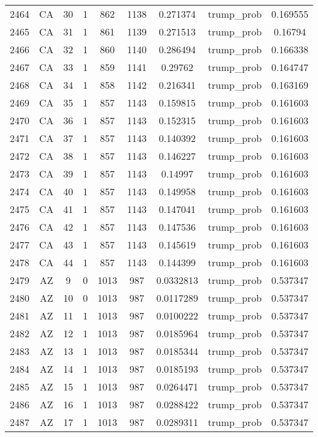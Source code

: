 \documentclass[12pt,a4paper]{article}
\begin{document}
\begin{tabular}{r|cccccccc}
	2464 & CA & 30 & 1 & 862 & 1138 & 0.271374 & trump\_prob & 0.169555 \\
	2465 & CA & 31 & 1 & 861 & 1139 & 0.271513 & trump\_prob & 0.16794 \\
	2466 & CA & 32 & 1 & 860 & 1140 & 0.286494 & trump\_prob & 0.166338 \\
	2467 & CA & 33 & 1 & 859 & 1141 & 0.29762 & trump\_prob & 0.164747 \\
	2468 & CA & 34 & 1 & 858 & 1142 & 0.216341 & trump\_prob & 0.163169 \\
	2469 & CA & 35 & 1 & 857 & 1143 & 0.159815 & trump\_prob & 0.161603 \\
	2470 & CA & 36 & 1 & 857 & 1143 & 0.152315 & trump\_prob & 0.161603 \\
	2471 & CA & 37 & 1 & 857 & 1143 & 0.140392 & trump\_prob & 0.161603 \\
	2472 & CA & 38 & 1 & 857 & 1143 & 0.146227 & trump\_prob & 0.161603 \\
	2473 & CA & 39 & 1 & 857 & 1143 & 0.14997 & trump\_prob & 0.161603 \\
	2474 & CA & 40 & 1 & 857 & 1143 & 0.149958 & trump\_prob & 0.161603 \\
	2475 & CA & 41 & 1 & 857 & 1143 & 0.147041 & trump\_prob & 0.161603 \\
	2476 & CA & 42 & 1 & 857 & 1143 & 0.147536 & trump\_prob & 0.161603 \\
	2477 & CA & 43 & 1 & 857 & 1143 & 0.145619 & trump\_prob & 0.161603 \\
	2478 & CA & 44 & 1 & 857 & 1143 & 0.144399 & trump\_prob & 0.161603 \\
	2479 & AZ & 9 & 0 & 1013 & 987 & 0.0332813 & trump\_prob & 0.537347 \\
	2480 & AZ & 10 & 0 & 1013 & 987 & 0.0117289 & trump\_prob & 0.537347 \\
	2481 & AZ & 11 & 1 & 1013 & 987 & 0.0100222 & trump\_prob & 0.537347 \\
	2482 & AZ & 12 & 1 & 1013 & 987 & 0.0185964 & trump\_prob & 0.537347 \\
	2483 & AZ & 13 & 1 & 1013 & 987 & 0.0185344 & trump\_prob & 0.537347 \\
	2484 & AZ & 14 & 1 & 1013 & 987 & 0.0185193 & trump\_prob & 0.537347 \\
	2485 & AZ & 15 & 1 & 1013 & 987 & 0.0264471 & trump\_prob & 0.537347 \\
	2486 & AZ & 16 & 1 & 1013 & 987 & 0.0288422 & trump\_prob & 0.537347 \\
	2487 & AZ & 17 & 1 & 1013 & 987 & 0.0289311 & trump\_prob & 0.537347 \\

\end{tabular}
\end{document}
